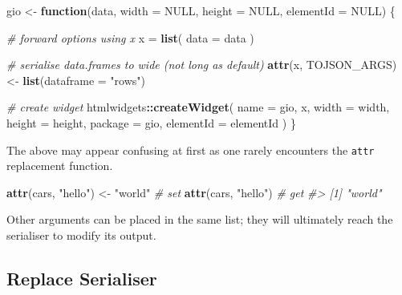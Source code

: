 \documentclass[
]{krantz}
\makeatletter
\newenvironment{Shaded}{\begin{snugshade}}{\end{snugshade}}
\newcommand{\CommentTok}[1]{\textcolor[rgb]{0.37,0.37,0.37}{\textit{#1}}}
\newcommand{\ControlFlowTok}[1]{\textcolor[rgb]{0.27,0.27,0.27}{\textbf{#1}}}
\newcommand{\DataTypeTok}[1]{\textcolor[rgb]{0.27,0.27,0.27}{#1}}
\newcommand{\KeywordTok}[1]{\textcolor[rgb]{0.27,0.27,0.27}{\textbf{#1}}}
\newcommand{\NormalTok}[1]{#1}
\newcommand{\OperatorTok}[1]{\textcolor[rgb]{0.43,0.43,0.43}{\textbf{#1}}}
\newcommand{\OtherTok}[1]{\textcolor[rgb]{0.37,0.37,0.37}{#1}}
\newcommand{\StringTok}[1]{\textcolor[rgb]{0.5,0.5,0.5}{#1}}
\newenvironment{kframe}{%
\medskip{}
\setlength{\fboxsep}{.8em}
 \def\at@end@of@kframe{}%
 \ifinner\ifhmode%
  \def\at@end@of@kframe{\end{minipage}}%
  \begin{minipage}{\columnwidth}%
 \fi\fi%
 \def\FrameCommand##1{\hskip\@totalleftmargin \hskip-\fboxsep
 \colorbox{shadecolor}{##1}\hskip-\fboxsep
     \hskip-\linewidth \hskip-\@totalleftmargin \hskip\columnwidth}%
 \MakeFramed {\advance\hsize-\width
   \@totalleftmargin\z@ \linewidth\hsize
   \@setminipage}}%
 {\par\unskip\endMakeFramed%
 \at@end@of@kframe}
\renewenvironment{Shaded}{\begin{kframe}}{\end{kframe}}
\makeatother
\begin{document}
\begin{Shaded}
\begin{Highlighting}[]
\NormalTok{gio <{-}}\StringTok{ }\ControlFlowTok{function}\NormalTok{(data, }\DataTypeTok{width =} \OtherTok{NULL}\NormalTok{, }\DataTypeTok{height =} \OtherTok{NULL}\NormalTok{, }
  \DataTypeTok{elementId =} \OtherTok{NULL}\NormalTok{) \{}

  \CommentTok{\# forward options using x}
\NormalTok{  x =}\StringTok{ }\KeywordTok{list}\NormalTok{(}
    \DataTypeTok{data =}\NormalTok{ data}
\NormalTok{  )}

  \CommentTok{\# serialise data.frames to wide (not long as default)}
  \KeywordTok{attr}\NormalTok{(x, }\StringTok{\textquotesingle{}TOJSON\_ARGS\textquotesingle{}}\NormalTok{) <{-}}\StringTok{ }\KeywordTok{list}\NormalTok{(}\DataTypeTok{dataframe =} \StringTok{"rows"}\NormalTok{)}

  \CommentTok{\# create widget}
\NormalTok{  htmlwidgets}\OperatorTok{::}\KeywordTok{createWidget}\NormalTok{(}
    \DataTypeTok{name =} \StringTok{\textquotesingle{}gio\textquotesingle{}}\NormalTok{,}
\NormalTok{    x,}
    \DataTypeTok{width =}\NormalTok{ width,}
    \DataTypeTok{height =}\NormalTok{ height,}
    \DataTypeTok{package =} \StringTok{\textquotesingle{}gio\textquotesingle{}}\NormalTok{,}
    \DataTypeTok{elementId =}\NormalTok{ elementId}
\NormalTok{  )}
\NormalTok{\}}
\end{Highlighting}
\end{Shaded}

The above may appear confusing at first as one rarely encounters the \texttt{attr} replacement function.

\begin{Shaded}
\begin{Highlighting}[]
\KeywordTok{attr}\NormalTok{(cars, }\StringTok{"hello"}\NormalTok{) <{-}}\StringTok{ "world"} \CommentTok{\# set }
\KeywordTok{attr}\NormalTok{(cars, }\StringTok{"hello"}\NormalTok{) }\CommentTok{\# get }
\CommentTok{\#> [1] "world"}
\end{Highlighting}
\end{Shaded}

Other arguments can be placed in the same list; they will ultimately reach the serialiser to modify its output.

\hypertarget{widgets-full-transform-data-replace}{%
\subsection{Replace Serialiser}\label{widgets-full-transform-data-replace}}
\end{document}
